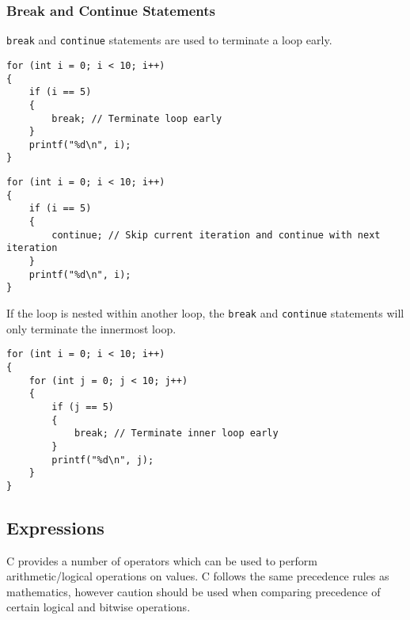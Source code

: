 \documentclass{article}
\begin{document}
\subsubsection{Break and Continue Statements}
\texttt{break} and \texttt{continue} statements are used to terminate a loop early.
\begin{verbatim}
for (int i = 0; i < 10; i++)
{
    if (i == 5)
    {
        break; // Terminate loop early
    }
    printf("%d\n", i);
}
\end{verbatim}
\begin{verbatim}
for (int i = 0; i < 10; i++)
{
    if (i == 5)
    {
        continue; // Skip current iteration and continue with next iteration
    }
    printf("%d\n", i);
}
\end{verbatim}
If the loop is nested within another loop, the \texttt{break}
and \texttt{continue} statements will only terminate the
innermost loop.
\begin{verbatim}
for (int i = 0; i < 10; i++)
{
    for (int j = 0; j < 10; j++)
    {
        if (j == 5)
        {
            break; // Terminate inner loop early
        }
        printf("%d\n", j);
    }
}
\end{verbatim}
\subsection{Expressions}
C provides a number of operators which can be used to perform
arithmetic/logical operations on values. C follows the same precedence
rules as mathematics, however caution should be used when comparing
precedence of certain logical and bitwise operations.
\end{document}
